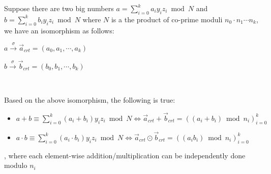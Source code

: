 \begin{tcolorbox}[title={\textbf{\tboxtheorem{\ref*{sec:chinese-remainder}.2} Application of the Chinese Remainder Theorem}}]

Suppose there are two big numbers $a = \sum\limits_{i=0}^k a_i y_i z_i \bmod N$ and $b = \sum\limits_{i=0}^k b_i y_i z_i \bmod N$  where $N$ is a the product of co-prime moduli $n_0 \cdot n_1 \cdots n_k$, we have an isomorphism as follows:

$a \xrightarrow{\sigma} \vec{a}_{\mathit{crt}} = (a_0, a_1, \cdots, a_k)$

$b \xrightarrow{\sigma} \vec{b}_{\mathit{crt}} = (b_0, b_1, \cdots, b_k)$

$ $

Based on the above isomorphism, the following is true:

\begin{itemize}

\item $a + b \equiv \sum\limits_{i=0}^k (a_i + b_i) y_i z_i \bmod N \Longleftrightarrow \vec{a}_{\mathit{crt}} + \vec{b}_{\mathit{crt}} = ((a_i+b_i)\bmod n_i)_{i=0}^{k}$

\item $a \cdot b \equiv \sum\limits_{i=0}^k (a_i \cdot b_i) y_i z_i \bmod N \Longleftrightarrow \vec{a}_{\mathit{crt}} \odot \vec{b}_{\mathit{crt}} = ((a_i b_i)\bmod n_i)_{i=0}^{k}$


\end{itemize}



, where each element-wise addition/multiplication can be independently done modulo $n_i$

\end{tcolorbox}
